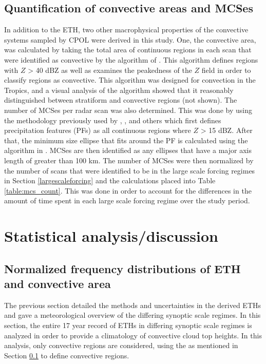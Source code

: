 \documentclass[journal abbreviation, manuscript]{copernicus}
\begin{document}
\subsection{Quantification of convective areas and MCSes} \label{convareas}
	In addition to the ETH, two other macrophysical properties of the convective systems sampled by CPOL were derived in this study. One, the convective area, was calculated by taking the total area of continuous regions in each scan that were identified as convective by the algorithm of \cite{Steineretal1995}. This algorithm defines regions with $Z$ > 40 dBZ as well as examines the peakedness of the $Z$ field in order to classify regions as convective. This algorithm was designed for convection in the Tropics, and a visual analysis of the algorithm showed that it reasonably distinguished between stratiform and convective regions (not shown). 
    The number of MCSes per radar scan was also determined. This was done by using the methodology previously used by \cite{RoweandHouze2014}, \cite{Nesbittetal2006}, and others which first defines precipitation features (PFs) as all continuous regions where $Z$ > 15 dBZ. After that, the minimum size ellipse that fits around the PF is calculated using the algorithm in \cite{opencv_library}. MCSes are then identified as any ellipses that have a major axis length of greater than 100 km. The number of MCSes were then normalized by the number of scans that were identified to be in the large scale forcing regimes in Section \ref{largescaleforcing} and the calculations placed into Table \ref{table:mcs_count}. This was done in order to account for the differences in the amount of time spent in each large scale forcing regime over the study period.

\section{Statistical analysis/discussion} \label{Statistical}

\subsection{Normalized frequency distributions of ETH and convective area} \label{ETHpdf}

    The previous section detailed the methods and uncertainties in the derived ETHs and gave a meteorological overview of the differing synoptic scale regimes. In this section, the entire 17 year record of ETHs in differing synoptic scale regimes is analyzed in order to provide a climatology of convective cloud top heights. In this analysis, only convective regions are considered, using the \cite{Steineretal1995} as mentioned in Section \ref{convareas} to define convective regions. 
\end{document}
